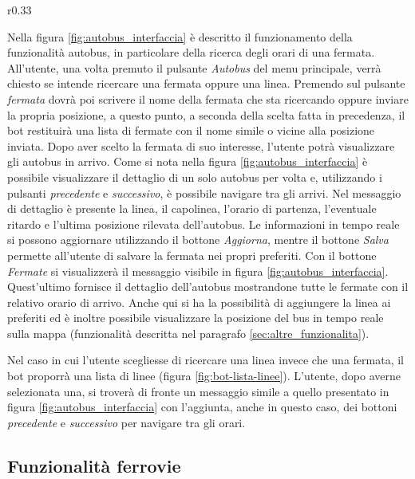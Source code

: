 \begin{wrapfigure}{r}{0.33\textwidth}
\centering
{}
\caption{Lista linee}
\label{fig:bot-lista-linee}
\end{wrapfigure}

Nella figura \ref{fig:autobus_interfaccia} è descritto il funzionamento della funzionalità autobus, in particolare della ricerca degli orari di una fermata. All'utente, una volta premuto il pulsante \textit{Autobus} del menu principale, verrà chiesto se intende ricercare una fermata oppure una linea. Premendo sul pulsante \textit{fermata} dovrà poi scrivere il nome della fermata che sta ricercando oppure inviare la propria posizione, a questo punto, a seconda della scelta fatta in precedenza, il bot restituirà una lista di fermate con il nome simile o vicine alla posizione inviata. Dopo aver scelto la fermata di suo interesse, l'utente potrà visualizzare gli autobus in arrivo. Come si nota nella figura \ref{fig:autobus_interfaccia} è possibile visualizzare il dettaglio di un solo autobus per volta e, utilizzando i pulsanti \textit{precedente} e \textit{successivo}, è possibile navigare tra gli arrivi. Nel messaggio di dettaglio è presente la linea, il capolinea, l'orario di partenza, l'eventuale ritardo e l'ultima posizione rilevata dell'autobus. Le informazioni in tempo reale si possono aggiornare utilizzando il bottone \textit{Aggiorna}, mentre il bottone \textit{Salva} permette all'utente di salvare la fermata nei propri preferiti. Con il bottone \textit{Fermate} si visualizzerà il messaggio visibile in figura \ref{fig:autobus_interfaccia}. Quest'ultimo fornisce il dettaglio dell'autobus mostrandone tutte le fermate con il relativo orario di arrivo. Anche qui si ha la possibilità di aggiungere la linea ai preferiti ed è inoltre possibile visualizzare la posizione del bus in tempo reale sulla mappa (funzionalità descritta nel paragrafo \ref{sec:altre_funzionalita}).

Nel caso in cui l'utente scegliesse di ricercare una linea invece che una fermata, il bot proporrà una lista di linee (figura \ref{fig:bot-lista-linee}). L'utente, dopo averne selezionata una, si troverà di fronte un messaggio simile a quello presentato in figura \ref{fig:autobus_interfaccia} con l'aggiunta, anche in questo caso, dei bottoni \textit{precedente} e \textit{successivo} per navigare tra gli orari.

\subsection{Funzionalità ferrovie}

